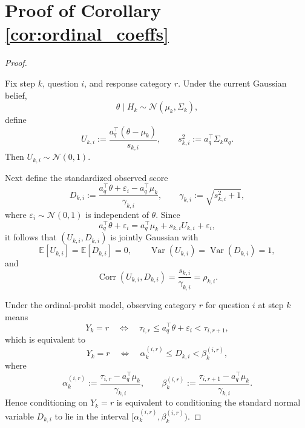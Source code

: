 \documentclass{article}
\begin{document}
\section{Proof of Corollary \ref{cor:ordinal_coeffs}}
\begin{proof}
\label{appendix:truncated_normal_derivation}

Fix step $k$, question $i$, and response category $r$. Under the current Gaussian belief,
\begin{equation*}
\theta \mid H_k \sim \mathcal N(\mu_k,\Sigma_k),
\end{equation*}
define
\begin{equation*}
U_{k,i}:=\frac{a_q^\top(\theta-\mu_k)}{s_{k,i}},
\qquad
s_{k,i}^2:=a_q^\top\Sigma_k a_q.
\end{equation*}
Then $U_{k,i}\sim \mathcal N(0,1)$.

Next define the standardized observed score
\begin{equation*}
D_{k,i}
:=
\frac{a_q^\top\theta+\varepsilon_i-a_q^\top\mu_k}{\gamma_{k,i}},
\qquad
\gamma_{k,i}:=\sqrt{s_{k,i}^2+1},
\end{equation*}
where $\varepsilon_i\sim\mathcal N(0,1)$ is independent of $\theta$. Since
\begin{equation*}
a_q^\top\theta+\varepsilon_i
=
a_q^\top\mu_k+s_{k,i}U_{k,i}+\varepsilon_i,
\end{equation*}
it follows that $(U_{k,i},D_{k,i})$ is jointly Gaussian with
\begin{equation*}
\mathbb E[U_{k,i}]
=
\mathbb E[D_{k,i}]
=
0,
\qquad
\operatorname{Var}(U_{k,i})
=
\operatorname{Var}(D_{k,i})
=
1,
\end{equation*}
and
\begin{equation*}
\operatorname{Corr}(U_{k,i},D_{k,i})
=
\frac{s_{k,i}}{\gamma_{k,i}}
=
\rho_{k,i}.
\end{equation*}

Under the ordinal-probit model, observing category $r$ for question $i$ at step $k$ means
\begin{equation*}
Y_k=r
\quad\Longleftrightarrow\quad
\tau_{i,r}\le a_q^\top\theta+\varepsilon_i<\tau_{i,r+1},
\end{equation*}
which is equivalent to
\begin{equation*}
Y_k=r
\quad\Longleftrightarrow\quad
\alpha_k^{(i,r)}\le D_{k,i}<\beta_k^{(i,r)},
\end{equation*}
where
\begin{equation*}
\alpha_k^{(i,r)}:=\frac{\tau_{i,r}-a_q^\top\mu_k}{\gamma_{k,i}},
\qquad
\beta_k^{(i,r)}:=\frac{\tau_{i,r+1}-a_q^\top\mu_k}{\gamma_{k,i}}.
\end{equation*}
Hence conditioning on $Y_k=r$ is equivalent to conditioning the standard normal
variable $D_{k,i}$ to lie in the interval $[\alpha_k^{(i,r)},\beta_k^{(i,r)})$.


\end{proof}
\end{document}
